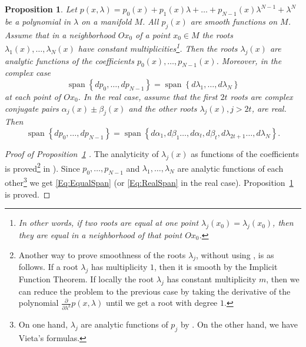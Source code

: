 \documentclass[12pt]{article}
\newtheorem{proposition}[lemma]{Proposition}
\theoremstyle{definition}
\begin{document}
\begin{proposition}\label{Prop:EigenSpan} Let $p(x, \lambda) = p_0(x) + p_1(x) \lambda + \dots + p_{N-1}(x) \lambda^{N-1} + \lambda^N$ be a polynomial in $\lambda$ on a manifold $M$. All $p_j(x)$ are smooth functions on $M$. Assume that in a neighborhood $Ox_0$ of a point $x_0 \in M$ the roots $\lambda_1(x), \dots, \lambda_N(x)$ have constant multiplicities\footnote{In other words, if two roots are equal at one point $\lambda_j(x_0) = \lambda_j(x_0)$, then they are equal in a neighborhood of that point $Ox_0$.}. Then the roots $\lambda_j(x)$ are analytic functions of the coefficients $p_0(x), \dots, p_{N-1}(x)$. Moreover, in the complex case  \begin{equation} \label{Eq:EqualSpan}  \operatorname{span} \left\{ dp_0, \dots, dp_{N-1}  \right\}  =  \operatorname{span} \left\{ d\lambda_1, \dots, d\lambda_N \right\} \end{equation} at each point of $Ox_0$. In the real case, assume that the first $2t$ roots are complex conjugate pairs $\alpha_j(x) \pm \beta_j(x)$ and the other roots $\lambda_j(x), j > 2t$, are real. Then \begin{equation} \label{Eq:RealSpan}  \operatorname{span} \left\{ dp_0, \dots, dp_{N-1} \right\} =  \operatorname{span} \left\{ d\alpha_1, d \beta_1 \dots, d\alpha_t,d \beta_t, d\lambda_{2t+1} \dots, d\lambda_{N} \right\}. \end{equation} \end{proposition}



\begin{proof}[Proof of Proposition~\ref{Prop:EigenSpan} ] The analyticity of $\lambda_j(x)$ as functions of the coefficients is proved\footnote{Another way to prove smoothness of the roots $\lambda_j$, without using \cite{Brillinger66}, is as follows. If a root $\lambda_j$ has multiplicity $1$, then it is smooth by the Implicit Function Theorem. If locally the root $\lambda_j$ has constant multiplicity $m$, then we can reduce the problem to the previous case by  taking the derivative of the polynomial $\frac{\partial}{\partial \lambda^k } p(x, \lambda)$ until we get a root with degree $1$.} in \cite{Brillinger66}). Since $p_0, \dots, p_{N-1}$ and $\lambda_1, \dots, \lambda_N$ are analytic functions of each other\footnote{On one hand, $\lambda_j$ are analytic functions of $p_j$ by  \cite{Brillinger66}. On the other hand, we have Vieta's formulas.} we get \eqref{Eq:EqualSpan} (or \eqref{Eq:RealSpan} in the real case).  Proposition~\ref{Prop:EigenSpan} is proved. \end{proof}
\end{document}

